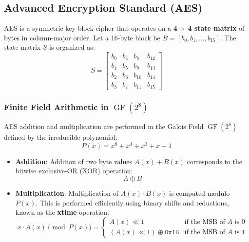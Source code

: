 \documentclass[11pt,a4paper]{article}
\DeclareMathOperator{\GF}{GF}
\begin{document}
\subsection{Advanced Encryption Standard (AES)}
AES is a symmetric-key block cipher that operates on a \textbf{4 $\times$ 4 state matrix} of bytes in column-major order.
Let a 16-byte block be $B = [b_0, b_1, \dots, b_{15}]$. The state matrix $S$ is organized as:
\begin{equation}
    S = \begin{bmatrix}
        b_0 & b_4 & b_8 & b_{12} \\
        b_1 & b_5 & b_9 & b_{13} \\
        b_2 & b_6 & b_{10} & b_{14} \\
        b_3 & b_7 & b_{11} & b_{15}
    \end{bmatrix}
\end{equation}

\subsubsection{Finite Field Arithmetic in \texorpdfstring{$\GF(2^8)$}{GF(2\textasciicircum 8)}}
AES addition and multiplication are performed in the Galois Field $\GF(2^8)$ defined by the irreducible polynomial:
\begin{equation}
    P(x) = x^8 + x^4 + x^3 + x + 1
\end{equation}
\begin{itemize}
    \item \textbf{Addition}: Addition of two byte values $A(x) + B(x)$ corresponds to the bitwise exclusive-OR (XOR) operation:
    \begin{equation}
        A \oplus B
    \end{equation}
    \item \textbf{Multiplication}: Multiplication of $A(x) \cdot B(x)$ is computed modulo $P(x)$. This is performed efficiently using binary shifts and reductions, known as the \textbf{xtime} operation:
    \begin{equation}
        x \cdot A(x) \pmod{P(x)} = \begin{cases}
            A(x) \ll 1 & \text{if the MSB of } A \text{ is } 0 \\
            (A(x) \ll 1) \oplus \mathtt{0x1B} & \text{if the MSB of } A \text{ is } 1
        \end{cases}
    \end{equation}
\end{itemize}
\end{document}
